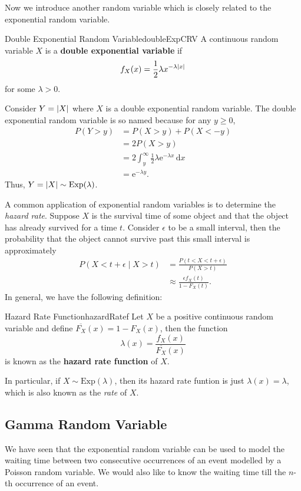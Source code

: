 \documentclass[math]{amznotes}
\theoremstyle{remark}
\begin{document}
Now we introduce another random variable which is closely related to the exponential random variable.
\begin{dfnbox}{Double Exponential Random Variable}{doubleExpCRV}
    A continuous random variable $X$ is a {\color{red} \textbf{double exponential variable}} if 
    \begin{equation*}
        f_X(x) = \frac{1}{2}\lambda x^{-\lambda{\left\lvert {x} \right\rvert}}
    \end{equation*}
    for some $\lambda > 0$.
\end{dfnbox}
Consider $Y = {\left\lvert {X} \right\rvert}$ where $X$ is a double exponential random variable. The double exponential random variable is so named because for any $y \geq 0$,
\begin{align*}
    P(Y > y) & = P(X > y) + P(X < -y) \\
    & = 2P(X > y) \\
    & = 2\int_{y}^{\infty}\!\frac{1}{2}\lambda \mathrm{e}^{-\lambda x}\,\mathrm{d}x \\
    & = \mathrm{e}^{-\lambda y}.
\end{align*}
Thus, $Y = {\left\lvert {X} \right\rvert} \sim \mathrm{Exp}(\lambda)$.

A common application of exponential random variables is to determine the \textit{hazard rate}. Suppose $X$ is the survival time of some object and that the object has already survived for a time $t$. Consider $\epsilon$ to be a small interval, then the probability that the object cannot survive past this small interval is approximately
\begin{align*}
    P(X < t + \epsilon \mid X > t) & = \frac{P(t < X < t + \epsilon)}{P(X > t)} \\
    & \approx \frac{\epsilon f_X(t)}{1 - F_X(t)}.
\end{align*}
In general, we have the following definition:
\begin{dfnbox}{Hazard Rate Function}{hazardRatef}
    Let $X$ be a positive continuous random variable and define $\overline{F_X}(x) = 1 - F_X(x)$, then the function
    \begin{equation*}
        \lambda(x) = \frac{f_X(x)}{\overline{F_X}(x)}
    \end{equation*}
    is known as the {\color{red} \textbf{hazard rate function}} of $X$.
\end{dfnbox}
In particular, if $X \sim \mathrm{Exp}(\lambda)$, then its hazard rate funtion is just $\lambda(x) = \lambda$, which is also known as the \textit{rate} of $X$.

\subsection{Gamma Random Variable}
We have seen that the exponential random variable can be used to model the waiting time between two consecutive occurrences of an event modelled by a Poisson random variable. We would also like to know the waiting time till the $n$-th occurrence of an event.
\end{document}
